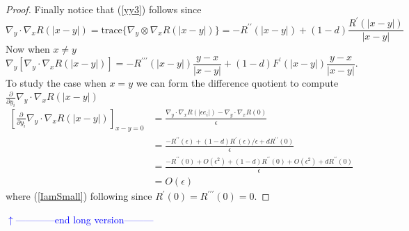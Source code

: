\documentclass[noinfoline]{imsart}
\begin{document}
{\begin{proof}
Finally notice that (\ref{yy3}) follows since
\[ \nabla_y \cdot \nabla_x R(|x-y|)=\text{trace}\bigl\{\nabla_y \otimes \nabla_x R(|x-y|) \bigr\}=-R^{\prime\prime}(|x-y|)+(1-d)\frac{R^\prime(|x-y|)}{|x-y|}\]
Now when $x\neq y$
\[ \nabla_y [ \nabla_y \cdot \nabla_x R(|x-y|)]=-R^{\prime\prime\prime}(|x-y|)\frac{y-x}{|x-y|}+(1-d) F^\prime(|x-y|) \frac{y-x}{|x-y|}. \]
To study the case when $x=y$ we can form the difference quotient to compute  $\frac{\partial }{\partial y_i} \nabla_y \cdot \nabla_x R(|x-y|)$
\begin{align}
\left[\frac{\partial }{\partial y_i} \nabla_y \cdot \nabla_x R(|x-y|)\right]_{x-y=0}&=\frac{ \nabla_y \cdot \nabla_x R(|\epsilon e_i|)-\nabla_y \cdot \nabla_x R(0) }{\epsilon} \\
&=\frac{-R^{\prime\prime}(\epsilon)+(1-d){R^\prime(\epsilon)}/{\epsilon}  +d R^{\prime\prime}(0) }{\epsilon} \\
&=\frac{-R^{\prime\prime}(0)+ O(\epsilon^2)+(1-d){R^{\prime\prime}(0)} + O(\epsilon^2)  +d R^{\prime\prime}(0) }{\epsilon}\label{IamSmall} \\
&=O(\epsilon)
\end{align}
where (\ref{IamSmall}) following since $R^\prime(0)=R^{\prime\prime\prime}(0)=0$.
\end{proof}
{\flushleft\textcolor{blue}{$\uparrow$------------end long version---------}}\newline
} \fi
\end{document}
